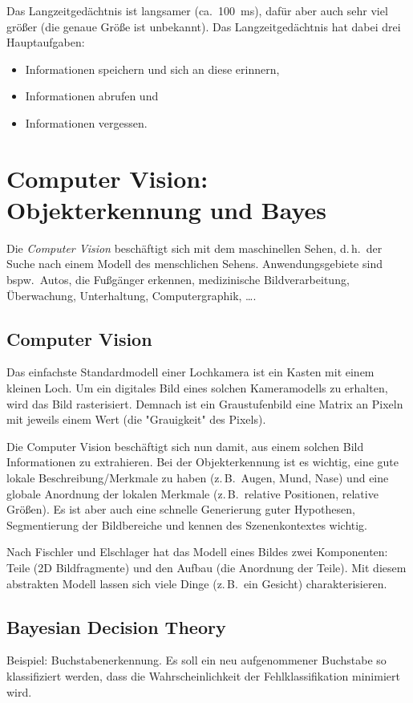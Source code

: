 \documentclass[a4paper, 11pt, accentcolor = tud3b]{tudreport}
\renewcommand{\dh}{d.\,h.~}
\newcommand{\ca}{ca.~}
\newcommand{\bspw}{bspw.~}
\newcommand{\zB}{z.\,B.~}
\begin{document}
				Das Langzeitgedächtnis ist langsamer (\ca \SI{100}{\milli\second}), dafür aber auch sehr viel größer (die genaue Größe ist unbekannt). Das Langzeitgedächtnis hat dabei drei Hauptaufgaben:
				\begin{itemize}
					\item Informationen speichern und sich an diese erinnern,
					\item Informationen abrufen und
					\item Informationen vergessen.
				\end{itemize}

	\chapter{Computer Vision: Objekterkennung und Bayes}
		Die \emph{Computer Vision} beschäftigt sich mit dem maschinellen Sehen, \dh der Suche nach einem Modell des menschlichen Sehens. Anwendungsgebiete sind \bspw Autos, die Fußgänger erkennen, medizinische Bildverarbeitung, Überwachung, Unterhaltung, Computergraphik, \dots.

		\section{Computer Vision}
			Das einfachste Standardmodell einer Lochkamera ist ein Kasten mit einem kleinen Loch. Um ein digitales Bild eines solchen Kameramodells zu erhalten, wird das Bild rasterisiert. Demnach ist ein Graustufenbild eine Matrix an Pixeln mit jeweils einem Wert (die "Grauigkeit" des Pixels).
			
			Die Computer Vision beschäftigt sich nun damit, aus einem solchen Bild Informationen zu extrahieren. Bei der Objekterkennung ist es wichtig, eine gute lokale Beschreibung/Merkmale zu haben (\zB Augen, Mund, Nase) und eine globale Anordnung der lokalen Merkmale (\zB relative Positionen, relative Größen). Es ist aber auch eine schnelle Generierung guter Hypothesen, Segmentierung der Bildbereiche und kennen des Szenenkontextes wichtig.
			
			Nach Fischler und Elschlager hat das Modell eines Bildes zwei Komponenten: Teile (2D Bildfragmente) und den Aufbau (die Anordnung der Teile). Mit diesem abstrakten Modell lassen sich viele Dinge (\zB ein Gesicht) charakterisieren.

		\section{Bayesian Decision Theory}
			Beispiel: Buchstabenerkennung. Es soll ein neu aufgenommener Buchstabe so klassifiziert werden, dass die Wahrscheinlichkeit der Fehlklassifikation minimiert wird.
\end{document}

